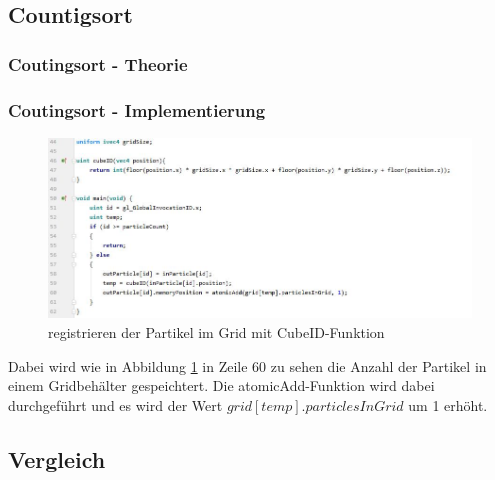 \documentclass[intern,palatino]{cgBA}
\begin{document}
\subsection{Countigsort}\label{counting}


\subsubsection{Coutingsort - Theorie}


\subsubsection{Coutingsort - Implementierung}
\begin{figure}[H]
	\centering
	\includegraphics[width=1.3\columnwidth]{Bilder/lable.jpg}
	\caption{registrieren der Partikel im Grid mit CubeID-Funktion }
	\label{img:lable}
\end{figure}

 Dabei wird wie in Abbildung \ref{img:lable} in Zeile 60 zu sehen die Anzahl der Partikel in einem Gridbehälter gespeichtert. Die atomicAdd-Funktion wird dabei durchgeführt und es wird der Wert $grid[temp].particlesInGrid$ um 1 erhöht. 


\subsection{Vergleich}\label{vergleich}

\end{document}
